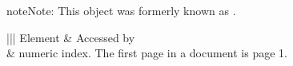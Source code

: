 \documentclass[letterpaper,12pt,english,openany,oneside]{sphinxmanual}
\begin{document}
\begin{sphinxadmonition}{note}{Note:}
This object was formerly known as .
\end{sphinxadmonition}
\label{\detokenize{IAC_API_AppleEvtObjects:elements-4}}


\begin{savenotes}\sphinxattablestart
\centering
{}\label{\detokenize{IAC_API_AppleEvtObjects:section-12}}\nobreak
\begin{tabular}[t]{|||}
\hline
\sphinxstyletheadfamily 
Element
&\sphinxstyletheadfamily 
Accessed by
\\
\hline
{}
&
numeric index. The first page in a document is page 1.
\\
\hline
\end{tabular}
\par
\sphinxattableend\end{savenotes}

\end{document}
